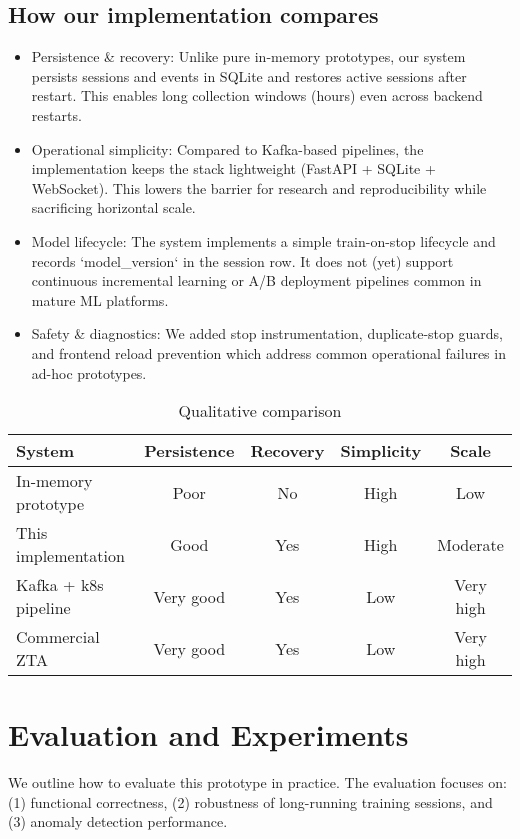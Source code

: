 \documentclass[conference]{IEEEtran}
\begin{document}
\subsection{How our implementation compares}
\begin{itemize}[leftmargin=*]
  \item Persistence & recovery: Unlike pure in-memory prototypes, our system persists sessions and events in SQLite and restores active sessions after restart. This enables long collection windows (hours) even across backend restarts.
  \item Operational simplicity: Compared to Kafka-based pipelines, the implementation keeps the stack lightweight (FastAPI + SQLite + WebSocket). This lowers the barrier for research and reproducibility while sacrificing horizontal scale.
  \item Model lifecycle: The system implements a simple train-on-stop lifecycle and records `model_version` in the session row. It does not (yet) support continuous incremental learning or A/B deployment pipelines common in mature ML platforms.
  \item Safety & diagnostics: We added stop instrumentation, duplicate-stop guards, and frontend reload prevention which address common operational failures in ad-hoc prototypes.
\end{itemize}

\begin{table}[t]
\centering
\caption{Qualitative comparison}
\begin{tabular}{@{}lcccc@{}}
\toprule
System & Persistence & Recovery & Simplicity & Scale\\
\midrule
In-memory prototype & Poor & No & High & Low\\
This implementation & Good & Yes & High & Moderate\\
Kafka + k8s pipeline & Very good & Yes & Low & Very high\\
Commercial ZTA & Very good & Yes & Low & Very high\\
\bottomrule
\end{tabular}
\label{tab:comp}
\end{table}

\section{Evaluation and Experiments}
We outline how to evaluate this prototype in practice. The evaluation focuses on: (1) functional correctness, (2) robustness of long-running training sessions, and (3) anomaly detection performance.
\end{document}
